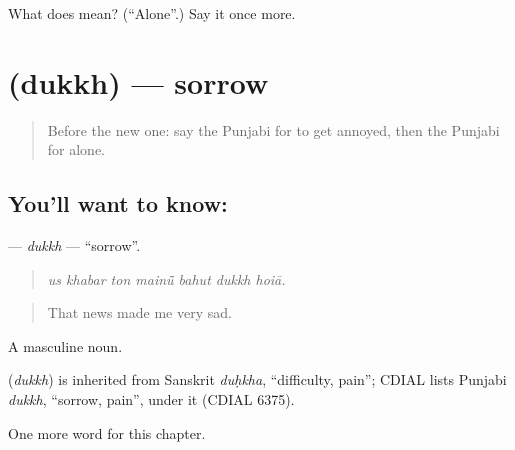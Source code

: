 \begin{tcolorbox}[breakable,colback=teal!4,colframe=teal!35!black,title={Before you move on}]
What does  mean? (\textquotedblleft{}Alone\textquotedblright{}.) Say it once more.
\end{tcolorbox}
\section[\texorpdfstring{\pa{ਦੁੱਖ} (dukkh)}{ਦੁੱਖ (dukkh)}]{ (dukkh) — sorrow}

\label{lesson:PA-C327-dukkh}



\begin{quote}
Before the new one: say the Punjabi for to get annoyed, then the Punjabi for alone.
\end{quote}

\subsection*{You'll want to know: }
\textbf{} — \emph{dukkh} — \textquotedblleft{}sorrow\textquotedblright{}.

\begin{quote}
      
\end{quote}

\begin{quote}
\emph{us khabar ton mainū̃ bahut dukkh hoiā.}
\end{quote}

\begin{quote}
That news made me very sad.
\end{quote}

A masculine noun.

\begin{cousinweb}
\textbf{} (\emph{dukkh}) is inherited from Sanskrit \emph{duḥkha}, \textquotedblleft{}difficulty, pain\textquotedblright{}; CDIAL lists Punjabi \emph{dukkh}, \textquotedblleft{}sorrow, pain\textquotedblright{}, under it (CDIAL 6375).
\end{cousinweb}

\begin{grammarlens}[title={What you've built}]
One more word for this chapter.
\end{grammarlens}

